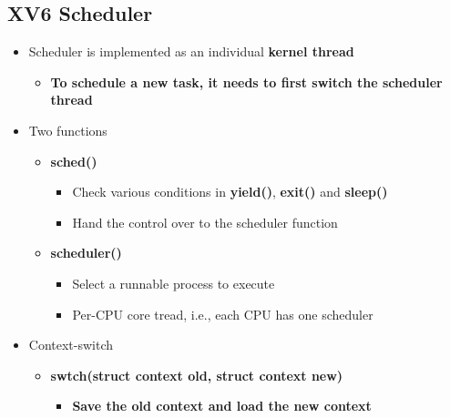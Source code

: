 \documentclass[a4paper,11pt,english]{article}
\begin{document}
\subsection*{XV6 Scheduler}
\begin{itemize}
    \item Scheduler is implemented as an individual \textbf{\color{blue} kernel thread}
        \begin{itemize}
            \item \textbf{\color{blue} To schedule a new task, it needs to first switch the scheduler thread}
        \end{itemize}
    \item Two functions
        \begin{itemize}
            \item \textbf{\color{blue} sched()}
                \begin{itemize}
                    \item Check various conditions in \textbf{\color{blue} yield()},\textbf{\color{blue} exit()} and \textbf{\color{blue} sleep()} 
                    \item Hand the control over to the scheduler function
                \end{itemize}
            \item \textbf{\color{blue} scheduler()}
                \begin{itemize}
                    \item Select a runnable process to execute
                    \item Per-CPU core tread, i.e., each CPU has one scheduler
                \end{itemize}
        \end{itemize}
    \item Context-switch
        \begin{itemize}
            \item \textbf{\color{blue} swtch(struct context\* old, struct context\* new)}
                \begin{itemize}
                    \item \textbf{\color{blue} Save the old context and load the new context}
                \end{itemize}
        \end{itemize}
\end{itemize}
\end{document}

